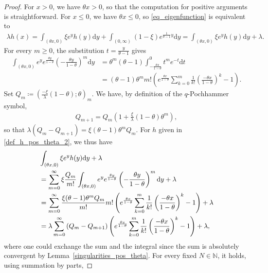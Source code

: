 \documentclass[10pt,a4paper]{amsart}
\newcommand{\N}{\mathbb{N}} %
\newcommand{\1}{\mathds{1}}
\renewcommand{\d}{\mathrm{d}}
\begin{document}
\begin{proof}
For $x>0$, we have $\theta x>0$, so that the computation for positive arguments is straightforward.
For $x\le0$, we have $\theta x\le0$, so \eqref{eq_eigenfunction} is equivalent to
  \begin{align}\label{eq_eigenvalue_concrete}
      \lambda h(x)=\int_{(\theta x,0)}\!\!\!\!\!\!\!\xi  e^yh(y)\d y+\int_{(0,\infty)}\!\!\!\!\!\!\!(1-\xi)  e^{\frac{1}{\theta-1}y}\d y=\int_{(\theta x,0)}\!\!\!\!\!\!\!\xi  e^yh(y)\d y+\lambda. 
  \end{align}
 For every $m\ge 0$, the substitution $t=\frac{y}{\theta-1}$ gives
  \begin{align*}
     \int_{(\theta x,0)} e^ye^{\frac{\theta y}{1-\theta}}\left(-\frac{\theta y}{1-\theta}\right)^m\d y
     &=\theta^m(\theta-1)\int_{-\frac{\theta x}{1-\theta}}^0 t^m e^{-t}\d t
     \\&=(\theta-1)\theta^mm!\left(e^{\frac{\theta x}{1-\theta}}\sum_{k=0}^m\frac{1}{k!}\left(\frac{-\theta x}{1-\theta}\right)^k-1\right).
  \end{align*}
  Set $Q_m\coloneqq \left(\frac{-\xi}{\lambda}(1-\theta);\theta\right)_m$. We have, by definition of the $q$-Pochhammer symbol, 
  \begin{align*}
      Q_{m+1}=Q_m\left(1+\frac{\xi}{\lambda}(1-\theta)\theta^m\right),
  \end{align*}
  so that
      $\lambda\left(Q_{m}-Q_{m+1}\right)=\xi(\theta-1)\theta^m Q_m$.
  For $h$ given in \eqref{def_h_pos_theta_2}, we thus have
  \begin{align}\label{calculation_eigenfunction}
      &\int_{(\theta x,0)}\xi  e^yh(y)\d y+\lambda \notag
      \\&=\sum_{m=0}^\infty\xi\frac{Q_m}{m!}\int_{(\theta x,0)} e^ye^{\frac{\theta y}{1-\theta}}\left(-\frac{\theta y}{1-\theta}\right)^m\d y+\lambda\notag
    \\&=\sum_{m=0}^\infty\frac{\xi(\theta-1)\theta^mQ_m}{m!}m!\left(e^{\frac{\theta x}{1-\theta}}\sum_{k=0}^m\frac{1}{k!}\left(\frac{-\theta x}{1-\theta}\right)^k-1\right)+\lambda\notag
    \\&=\lambda\sum_{m=0}^\infty \left(Q_{m}-Q_{m+1}\right)\left(e^{\frac{\theta x}{1-\theta}}\sum_{k=0}^m\frac{1}{k!}\left(\frac{-\theta x}{1-\theta}\right)^k-1\right)+\lambda,
  \end{align}
where one could exchange the sum and the integral since the sum is absolutely convergent by Lemma~\ref{singularities_pos_theta}. For every fixed $N\in\N$, it holds, using summation by parts,

\end{proof}
\end{document}
